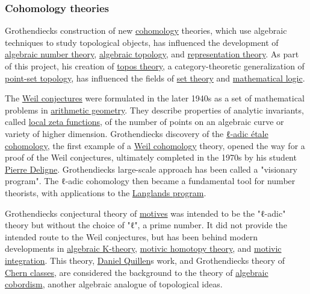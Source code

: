 \subsubsection{Cohomology theories}\label{Cohomology_theories}

Grothendieck\textquotesingle s construction of new \href{https://en.wikipedia.org/wiki/Cohomology}{cohomology} theories, which use algebraic techniques to study topological objects, has influenced the development of \href{https://en.wikipedia.org/wiki/Algebraic_number_theory}{algebraic number theory}, \href{https://en.wikipedia.org/wiki/Algebraic_topology}{algebraic topology}, and \href{https://en.wikipedia.org/wiki/Representation_theory}{representation theory}. As part of this project, his creation of \href{https://en.wikipedia.org/wiki/Topos_theory}{topos theory}, a category-theoretic generalization of \href{https://en.wikipedia.org/wiki/Point-set_topology}{point-set topology}, has influenced the fields of \href{https://en.wikipedia.org/wiki/Set_theory}{set theory} and \href{https://en.wikipedia.org/wiki/Mathematical_logic}{mathematical logic}.

The \href{https://en.wikipedia.org/wiki/Weil_conjectures}{Weil conjectures} were formulated in the later 1940s as a set of mathematical problems in \href{https://en.wikipedia.org/wiki/Arithmetic_geometry}{arithmetic geometry}. They describe properties of analytic invariants, called \href{https://en.wikipedia.org/wiki/Local_zeta_function}{local zeta functions}, of the number of points on an algebraic curve or variety of higher dimension. Grothendieck\textquotesingle s discovery of the \href{https://en.wikipedia.org/wiki/Étale_cohomology}{ℓ-adic étale cohomology}, the first example of a \href{https://en.wikipedia.org/wiki/Weil_cohomology}{Weil cohomology} theory, opened the way for a proof of the Weil conjectures, ultimately completed in the 1970s by his student \href{https://en.wikipedia.org/wiki/Pierre_Deligne}{Pierre Deligne}. Grothendieck\textquotesingle s large-scale approach has been called a "visionary program". The ℓ-adic cohomology then became a fundamental tool for number theorists, with applications to the \href{https://en.wikipedia.org/wiki/Langlands_program}{Langlands program}.

Grothendieck\textquotesingle s conjectural theory of \href{https://en.wikipedia.org/wiki/Motive_(algebraic_geometry)}{motives} was intended to be the "ℓ-adic" theory but without the choice of "ℓ", a prime number. It did not provide the intended route to the Weil conjectures, but has been behind modern developments in \href{https://en.wikipedia.org/wiki/Algebraic_K-theory}{algebraic K-theory}, \href{https://en.wikipedia.org/wiki/Motivic_cohomology}{motivic homotopy theory}, and \href{https://en.wikipedia.org/wiki/Motivic_integration}{motivic integration}. This theory, \href{https://en.wikipedia.org/wiki/Daniel_Quillen}{Daniel Quillen}\textquotesingle s work, and Grothendieck\textquotesingle s theory of \href{https://en.wikipedia.org/wiki/Chern_class}{Chern classes}, are considered the background to the theory of \href{https://en.wikipedia.org/wiki/Algebraic_cobordism}{algebraic cobordism}, another algebraic analogue of topological ideas.


